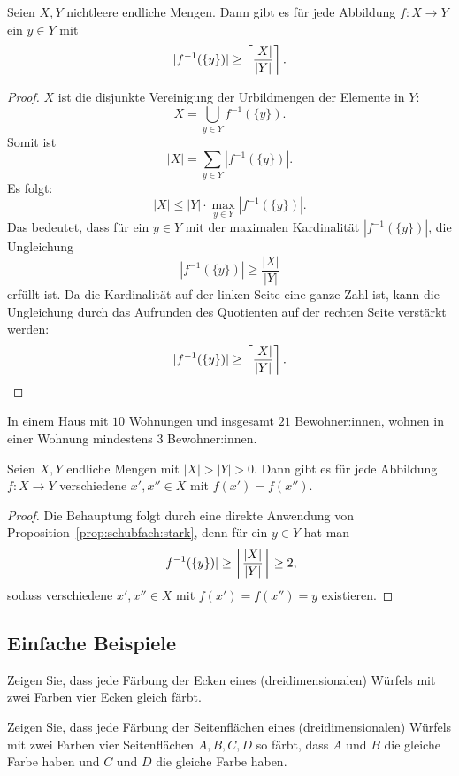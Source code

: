 \begin{prop} \label{prop:schubfach:stark}
	Seien $X, Y$ nichtleere endliche Mengen. Dann gibt es für jede Abbildung $f: X \to Y$ ein $y \in Y$ mit 
	\[
		|f^{-1} (\{y\})|  \ge  \left\lceil \frac{|X|}{|Y|} \right\rceil .
	\]
\end{prop} 
\begin{proof} $X$ ist die disjunkte Vereinigung der Urbildmengen der Elemente in $Y$:
	\[
			X = \bigcup_{y \in Y} f^{-1}(\{y\}) .
	\]
	Somit ist 
	\[
		|X| = \sum_{y \in Y} | f^{-1}(\{y\}) | .
	\]
	Es folgt: 
	\[
		|X| \le |Y| \cdot \max_{y \in Y} |f^{-1}(\{y\}) |. 
	\]
	Das bedeutet, dass für ein $y \in Y$ mit der maximalen Kardinalität $|f^{-1}(\{y\}) |$, die Ungleichung 
	\[
			|f^{-1}(\{y\})| \ge \frac{|X|}{|Y|}
	\]
	erfüllt ist. Da die Kardinalität auf der linken Seite eine ganze Zahl ist, kann die Ungleichung durch das Aufrunden des Quotienten auf der rechten Seite verstärkt werden: 
	\[
			|f^{-1}(\{y\})| \ge \left\lceil \frac{|X|}{|Y|} \right\rceil.
	\]
\end{proof} 


\begin{bsp}
	In einem Haus mit $10$ Wohnungen und insgesamt $21$ Bewohner:innen, wohnen in einer Wohnung mindestens $3$ Bewohner:innen. 
\end{bsp} 

\begin{kor} 
	Seien $X, Y$ endliche Mengen mit $|X| > |Y| >0$. Dann gibt es für jede Abbildung $f : X \to Y$ verschiedene $x',x''\in X$ mit $f(x')=f(x'')$. 
\end{kor} 
\begin{proof}
	Die Behauptung folgt durch eine direkte Anwendung von Proposition~\ref{prop:schubfach:stark}, denn für ein $y \in Y$ hat man 
	\[
		| f^{-1}(\{y\}) | \ge \left\lceil \frac{|X|}{|Y|} \right\rceil \ge 2,
	\]
	sodass verschiedene $x',x'' \in X$ mit $f(x') = f(x'') =y$ existieren. 
\end{proof} 


\subsection{Einfache Beispiele} 

\begin{aufg}
	Zeigen Sie, dass jede Färbung der Ecken eines (dreidimensionalen) Würfels mit zwei Farben vier Ecken gleich färbt. 
\end{aufg}

\begin{aufg}
Zeigen Sie, dass jede Färbung der Seitenflächen eines (dreidimensionalen) Würfels mit zwei Farben vier Seitenflächen $A, B, C, D$ so färbt, dass $A$ und $B$ die gleiche Farbe haben und $C$ und $D$ die gleiche Farbe haben.
\end{aufg}

